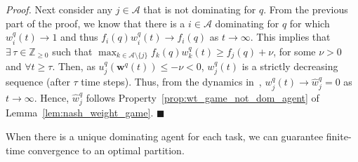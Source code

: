 \documentclass{IEEEtran}
\newcommand{\Mcal}[1]{\mathcal{#1}}
\newcommand{\bld}[1]{\mathbf{#1}}
\newcommand{\integer}{\ensuremath{\mathbb{Z}}}
\newcommand{\squaresym}{\hbox{$\blacksquare$}}
\newcommand{\proofend}{\relax\ifmmode\else\unskip\hfill\fi\squaresym}
\renewenvironment{proof}{\textit{Proof.} }{\proofend}
\renewcommand{\hat}[1]{\widehat{#1}}
\newcommand{\marginn}[1]{\marginpar{\color{blue}\tiny\ttfamily#1}}
\newcommand{\margin}[1]{\marginpar{\color{magenta}\tiny\ttfamily#1}}
\def \agt{\Mcal{A}}
\def \integer{\mathbb{Z}}
\def \intpos{\integer_{\geq 0}}
\def \w{\bld{w}}
\def \what{\hat{w}}
\begin{document}
\begin{proof}
  Next consider any $j \in \agt$ that is not dominating for $q$. From the previous part of the proof, we know that there is
  a $i \in \agt$ dominating for $q$ for which
  $w^q_i(t) \to 1$ and thus $f_i(q)w^q_i(t) \to f_i(q)$ as
  $t \to \infty$. 
This implies that
  $\exists \,\tau \in \intpos$ such that
  $\max_{k \in \agt \setminus \{j\}}f_k(q)w^q_k(t) \geq f_j(q) +
  \nu$, for some $\nu > 0$ and $\forall t \geq
  \tau$. Then, as $u^q_j(\w^q(t)) \leq -\nu < 0$, $w^q_j(t)$ is a strictly decreasing sequence (after $\tau$
  time steps). Thus, from the dynamics
  in~, %
  $w^q_j(t) \to \what^q_j = 0$ as $t \to \infty$. Hence, $\what^q_j$
  follows Property~\ref{prop:wt_game_not_dom_agent}
of Lemma~\ref{lem:nash_weight_game}.
\end{proof}

When there is a unique dominating agent for each task, we can
guarantee finite-time convergence to an optimal
partition.%
\end{document}
